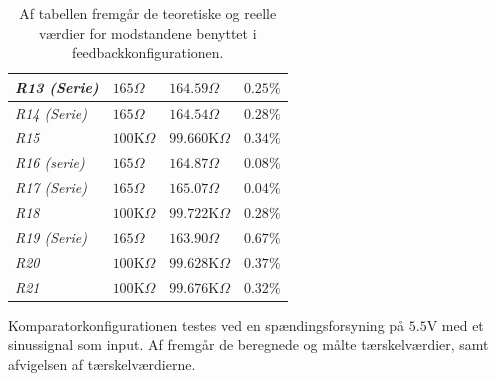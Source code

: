 \begin{table}[H]
\begin{tabular}{|l|l|l|l|}
\textit{R13 (Serie)}    & $165\Omega$              & $164.59\Omega$      & $0.25\%$           \\ \hline
\textit{R14 (Serie)}    & $165\Omega$              & $164.54\Omega$      & $0.28\%$           \\ \hline
\textit{R15}            & $100$K$\Omega$           & $99.660$K$\Omega$   & $0.34\%$           \\ \hline
\textit{R16 (serie)}    & $165\Omega$              & $164.87\Omega$      & $0.08\%$           \\ \hline
\textit{R17 (Serie)}    & $165\Omega$              & $165.07\Omega$      & $0.04\%$           \\ \hline
\textit{R18}            & $100$K$\Omega$           & $99.722$K$\Omega$   & $0.28\%$           \\ \hline
\textit{R19 (Serie)}    & $165\Omega$              & $163.90\Omega$      & $0.67\%$           \\ \hline
\textit{R20}            & $100$K$\Omega$           & $99.628$K$\Omega$   & $0.37\%$           \\ \hline
\textit{R21}            & $100$K$\Omega$           & $99.676$K$\Omega$   & $0.32\%$           \\ \hline
\end{tabular}
\caption{Af tabellen fremgår de teoretiske og reelle værdier for modstandene benyttet i feedbackkonfigurationen.}
\label{Tab:komparator_modstande}
\end{table}
\noindent Komparatorkonfigurationen testes ved en spændingsforsyning på $5.5$V med et sinussignal som input. Af  fremgår de beregnede og målte tærskelværdier, samt afvigelsen af tærskelværdierne. 

